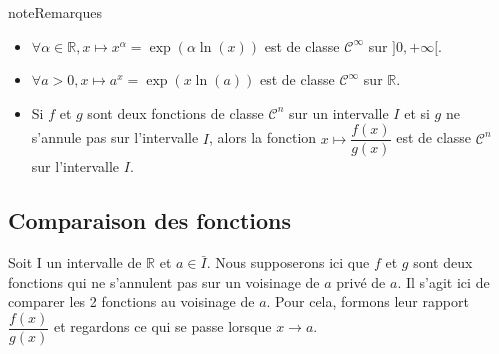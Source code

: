\documentclass[letterpaper,10pt,french]{jupyterBook}
\begin{document}
\begin{sphinxadmonition}{note}{Remarques}
\begin{itemize}
\item {} 
\sphinxAtStartPar
\(\forall \alpha \in \mathbb{R}, x \mapsto x^\alpha=\exp(\alpha\ln(x))\) est de classe \(\mathscr{C}^\infty\) sur \(]0, +\infty[\).

\item {} 
\sphinxAtStartPar
\(\forall a >0, x \mapsto a^x=\exp(x\ln(a))\) est de classe \(\mathscr{C}^\infty\) sur \(\mathbb{R}\).

\item {} 
\sphinxAtStartPar
Si \(f\) et \(g\) sont deux fonctions de classe \(\mathscr{C}^n\) sur un intervalle \(I\) et si \(g\) ne s’annule pas sur l’intervalle \(I\), alors la fonction \( x \mapsto\dfrac{f(x)}{g(x)}\) est de classe \(\mathscr{C}^n\) sur l’intervalle \(I\).

\end{itemize}
\end{sphinxadmonition}


\subsection{Comparaison des fonctions}
\label{\detokenize{complements:comparaison-des-fonctions}}
\sphinxAtStartPar
Soit I un intervalle de \(\mathbb{R}\) et \(a\in \bar{I}\). Nous supposerons ici que \(f\) et \(g\) sont deux fonctions qui ne s’annulent pas sur un voisinage de \(a\) privé de \(a\).
Il s’agit ici de comparer les 2 fonctions au voisinage de \(a\).  Pour cela, formons leur rapport \(\dfrac{f(x)}{g(x)}\) et regardons ce qui se passe lorsque \(x \to a\).
\end{document}
